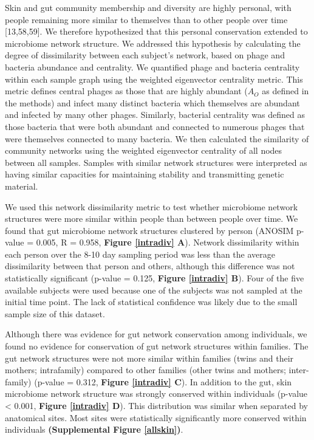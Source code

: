 \documentclass[12pt,]{article}
\begin{document}
Skin and gut community membership and diversity are highly personal,
with people remaining more similar to themselves than to other people
over time {[}13,58,59{]}. We therefore hypothesized that this personal
conservation extended to microbiome network structure. We addressed this
hypothesis by calculating the degree of dissimilarity between each
subject's network, based on phage and bacteria abundance and centrality.
We quantified phage and bacteria centrality within each sample graph
using the weighted eigenvector centrality metric. This metric defines
central phages as those that are highly abundant (\(A_{O}\) as defined
in the methods) and infect many distinct bacteria which themselves are
abundant and infected by many other phages. Similarly, bacterial
centrality was defined as those bacteria that were both abundant and
connected to numerous phages that were themselves connected to many
bacteria. We then calculated the similarity of community networks using
the weighted eigenvector centrality of all nodes between all samples.
Samples with similar network structures were interpreted as having
similar capacities for maintaining stability and transmitting genetic
material.

We used this network dissimilarity metric to test whether microbiome
network structures were more similar within people than between people
over time. We found that gut microbiome network structures clustered by
person (ANOSIM p-value = 0.005, R = 0.958, \textbf{Figure \ref{intradiv}
A}). Network dissimilarity within each person over the 8-10 day sampling
period was less than the average dissimilarity between that person and
others, although this difference was not statistically significant
(p-value = 0.125, \textbf{Figure \ref{intradiv} B}). Four of the five
available subjects were used because one of the subjects was not sampled
at the initial time point. The lack of statistical confidence was likely
due to the small sample size of this dataset.

Although there was evidence for gut network conservation among
individuals, we found no evidence for conservation of gut network
structures within families. The gut network structures were not more
similar within families (twins and their mothers; intrafamily) compared
to other families (other twins and mothers; inter-family) (p-value =
0.312, \textbf{Figure \ref{intradiv} C}). In addition to the gut, skin
microbiome network structure was strongly conserved within individuals
(p-value \textless{} 0.001, \textbf{Figure \ref{intradiv} D}). This
distribution was similar when separated by anatomical sites. Most sites
were statistically significantly more conserved within individuals
\textbf{(Supplemental Figure \ref{allskin})}.
\end{document}
